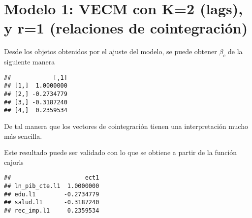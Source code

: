 \documentclass[]{book}
\newenvironment{Shaded}{\begin{snugshade}}{\end{snugshade}}
\newcommand{\KeywordTok}[1]{\textcolor[rgb]{0.13,0.29,0.53}{\textbf{#1}}}
\newcommand{\DataTypeTok}[1]{\textcolor[rgb]{0.13,0.29,0.53}{#1}}
\newcommand{\DecValTok}[1]{\textcolor[rgb]{0.00,0.00,0.81}{#1}}
\newcommand{\StringTok}[1]{\textcolor[rgb]{0.31,0.60,0.02}{#1}}
\newcommand{\OperatorTok}[1]{\textcolor[rgb]{0.81,0.36,0.00}{\textbf{#1}}}
\newcommand{\NormalTok}[1]{#1}
\theoremstyle{definition}
\theoremstyle{definition}
\theoremstyle{definition}
\theoremstyle{remark}
\begin{document}
\section{Modelo 1: VECM con K=2 (lags), y r=1 (relaciones de
cointegración)}\label{modelo-1-vecm-con-k2-lags-y-r1-relaciones-de-cointegracion}

Desde los objetos obtenidos por el ajuste del modelo, se puede obtener
\(\beta_c\) de la siguiente manera

\begin{Shaded}
\end{Shaded}

\begin{verbatim}
##            [,1]
## [1,]  1.0000000
## [2,] -0.2734779
## [3,] -0.3187240
## [4,]  0.2359534
\end{verbatim}

De tal manera que los vectores de cointegración tienen una
interpretación mucho más sencilla.

Este resultado puede ser validado con lo que se obtiene a partir de la
función cajorls

\begin{Shaded}
\end{Shaded}

\begin{verbatim}
##                     ect1
## ln_pib_cte.l1  1.0000000
## edu.l1        -0.2734779
## salud.l1      -0.3187240
## rec_imp.l1     0.2359534
\end{verbatim}
\end{document}
